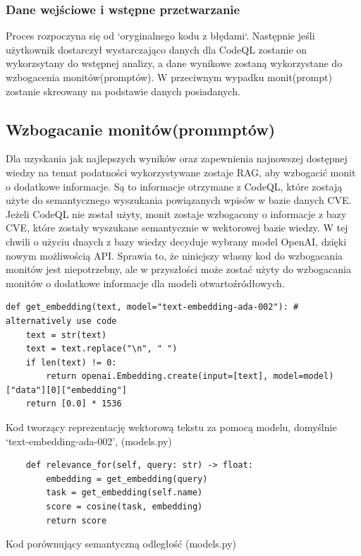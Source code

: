 \subsubsection{Dane wejściowe i wstępne przetwarzanie}
Proces rozpoczyna się od `oryginalnego kodu z błędami`. Następnie jeśli użytkownik dostarczył wystarczająco danych dla CodeQL zostanie on wykorzsytany do wstępnej analizy, a dane wynikowe zostaną wykorzystane do wzbogacenia monitów(promptów). 
W przeciwnym wypadku monit(prompt) zostanie skreowany na podstawie danych posiadanych. 

\subsection{Wzbogacanie monitów(prommptów)}
Dla uzyskania jak najlepszych wyników oraz zapewnienia najnowszej dostępnej wiedzy na temat podatności wykorzystywane zostaje RAG, aby wzbogacić monit o dodatkowe informacje. Są to informacje otrzymane z CodeQL, które zostają użyte do semantycznego wyszukania powiązanych wpisów w bazie danych CVE. 
Jeżeli CodeQL nie został użyty, monit zostaje wzbogacony o informacje z bazy CVE, które zostały wyszukane semantycznie w wektorowej bazie wiedzy. W tej chwili o użyciu dnaych z bazy wiedzy decyduje wybrany model OpenAI, dzięki nowym możliwością API. 
Sprawia to, że niniejszy własny kod do wzbogacania monitów jest niepotrzebny, ale w przyszłości może zostać użyty do wzbogacania monitów o dodatkowe informacje dla modeli otwartoźródłowych. 
\begin{listing}
    \begin{verbatim}  
def get_embedding(text, model="text-embedding-ada-002"): # alternatively use code
    text = str(text)
    text = text.replace("\n", " ")
    if len(text) != 0:
        return openai.Embedding.create(input=[text], model=model)["data"][0]["embedding"]
    return [0.0] * 1536

    \end{verbatim}
    \caption{Kod tworzący reprezentację wektorową tekstu za pomocą modelu, domyślnie `text-embedding-ada-002', (models.py)} 
    \label{listing:vector_embedding}
\end{listing}
    
\begin{listing}
    \begin{verbatim}  
    def relevance_for(self, query: str) -> float:
        embedding = get_embedding(query)
        task = get_embedding(self.name)
        score = cosine(task, embedding)
        return score
    \end{verbatim}
    \caption{Kod porównujący semantyczną odległość (models.py)} 
    \label{listing:vector_relevance}
\end{listing}
    


